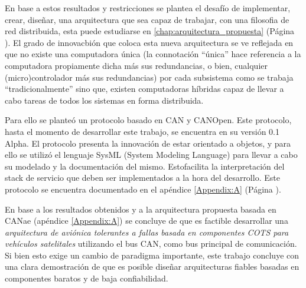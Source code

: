 En base a estos resultados y restricciones se plantea el desafío de implementar,
crear, diseñar, una arquitectura que sea capaz de trabajar, con una filosofia
de red distribuida, esta puede estudiarse en \ref{chap:arquitectura_propuesta}
(Página \pageref{chap:arquitectura_propuesta}). El grado de innovacbión que coloca
esta nueva arquitectura se ve reflejada en que no existe una computadora única (la
connotación ``única'' hace referencia a la computadora propiamente dicha más sus
redundancias, o bien, cualquier (micro)controlador más sus redundancias) por cada
subsistema como se trabaja ``tradicionalmente'' sino que, existen computadoras
híbridas capaz de llevar a cabo tareas de todos los sistemas en forma distribuida. 

Para ello se planteó un protocolo basado en CAN y CANOpen. Este protocolo, hasta el
momento de desarrollar este trabajo, se encuentra en su versión 0.1 Alpha. El protocolo
presenta la innovación de estar orientado a objetos, y para ello se utilizó el
lenguaje SysML (System Modeling Language) para llevar a cabo su modelado y
la documentación del mismo. Estofacilita la interpretación del
stack de servicio que deben ser implementados a la hora del desarrollo. Este protocolo
se encuentra documentado en el apéndice \ref{Appendix:A} (Página \pageref{Appendix:A}).

En base a los resultados obtenidos y a la arquitectura propuesta basada en CANae
(apéndice \ref{Appendix:A}) se concluye de que es factible  desarrollar una
\textit{arquitectura de aviónica tolerantes a fallas basada en componentes COTS para
  vehículos satelitales} utilizando el bus CAN, como bus principal de comunicación.
Si bien esto exige un cambio de paradigma importante, este trabajo concluye con una
clara demostración de que es posible diseñar arquitecturas fiables basadas
en componentes baratos y de baja confiabilidad.  

